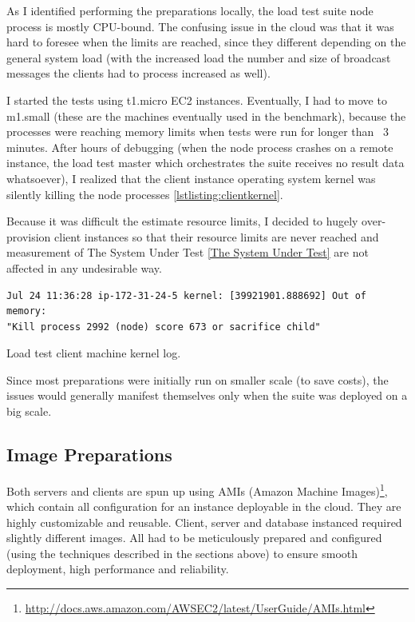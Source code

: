 \documentclass{uvamscse}
\begin{document}
As I identified performing the preparations locally, the load test suite node process is mostly CPU-bound. The confusing issue in the cloud was that it was hard to foresee when the limits are reached, since they different depending on the general system load (with the increased load the number and size of broadcast messages the clients had to process increased as well).

I started the tests using t1.micro EC2 instances. Eventually, I had to move to m1.small (these are the machines eventually used in the benchmark), because the processes were reaching memory limits when tests were run for longer than ~3 minutes. After hours of debugging (when the node process crashes on a remote instance, the load test master which orchestrates the suite receives no result data whatsoever), I realized that the client instance operating system kernel was silently killing the node processes \ref{lstlisting:clientkernel}.

Because it was difficult the estimate resource limits, I decided to hugely over-provision client instances so that their resource limits are never reached and measurement of The System Under Test \ref{The System Under Test} are not affected in any undesirable way.

\begin{sourcecode}[h]
\begin{lstlisting}[style=mono]
Jul 24 11:36:28 ip-172-31-24-5 kernel: [39921901.888692] Out of memory:
"Kill process 2992 (node) score 673 or sacrifice child"
\end{lstlisting}
\caption{Load test client machine kernel log.}
\label{lstlisting:clientkernel}
\end{sourcecode}

Since most preparations were initially run on smaller scale (to save costs), the issues would generally manifest themselves only when the suite was deployed on a big scale.

\subsection{Image Preparations}
Both servers and clients are spun up using AMIs (Amazon Machine Images)\footnote{\url{http://docs.aws.amazon.com/AWSEC2/latest/UserGuide/AMIs.html}}, which contain all configuration for an instance deployable in the cloud. They are highly customizable and reusable. Client, server and database instanced required slightly different images. All had to be meticulously prepared and configured (using the techniques described in the sections above) to ensure smooth deployment, high performance and reliability.
\end{document}
